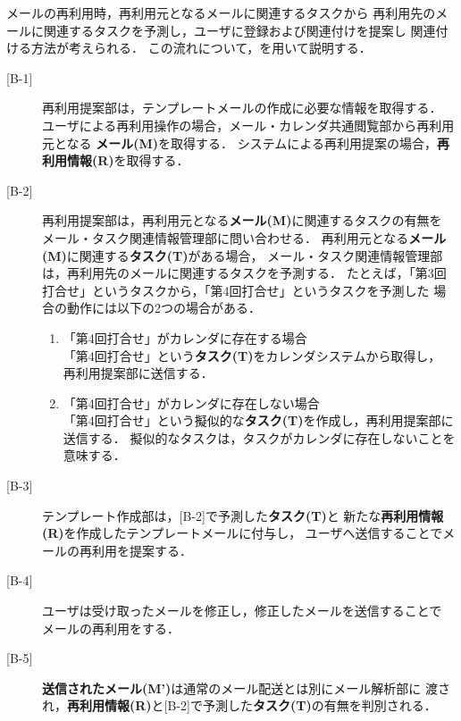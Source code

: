 \documentclass[submit,techreq,noauthor,dvipdfmx]{ipsj}
\begin{document}
メールの再利用時，再利用元となるメールに関連するタスクから
再利用先のメールに関連するタスクを予測し，ユーザに登録および関連付けを提案し
関連付ける方法が考えられる．
この流れについて，を用いて説明する．

\begin{description}
\item[[B-1\textrm{]}] 再利用提案部は，テンプレートメールの作成に必要な情報を取得する．
  ユーザによる再利用操作の場合，メール・カレンダ共通閲覧部から再利用元となる
  {\bf メール(M)}を取得する．
  システムによる再利用提案の場合，{\bf 再利用情報(R)}を取得する．

\item[[B-2\textrm{]}] 再利用提案部は，再利用元となる{\bf メール(M)}に関連するタスクの有無を
  メール・タスク関連情報管理部に問い合わせる．
  再利用元となる{\bf メール(M)}に関連する{\bf タスク(T)}がある場合，
  メール・タスク関連情報管理部は，再利用先のメールに関連するタスクを予測する．
  たとえば，「第3回打合せ」というタスクから，「第4回打合せ」というタスクを予測した
  場合の動作には以下の2つの場合がある．
\begin{enumerate}

\item 「第4回打合せ」がカレンダに存在する場合\\
  「第4回打合せ」という{\bf タスク(T)}をカレンダシステムから取得し，
  再利用提案部に送信する．

\item 「第4回打合せ」がカレンダに存在しない場合\\
  「第4回打合せ」という擬似的な{\bf タスク(T)}を作成し，再利用提案部に送信する．
  擬似的なタスクは，タスクがカレンダに存在しないことを意味する．

\end{enumerate}

\item[[B-3\textrm{]}] テンプレート作成部は，[B-2]で予測した{\bf タスク(T)}と
  新たな{\bf 再利用情報(R)}を作成したテンプレートメールに付与し，
  ユーザへ送信することでメールの再利用を提案する．

\item[[B-4\textrm{]}] ユーザは受け取ったメールを修正し，修正したメールを送信することで
  メールの再利用をする．

\item[[B-5\textrm{]}] {\bf 送信されたメール(M')}は通常のメール配送とは別にメール解析部に
  渡され，{\bf 再利用情報(R)}と[B-2]で予測した{\bf タスク(T)}の有無を判別される．


\end{description}
\end{document}
